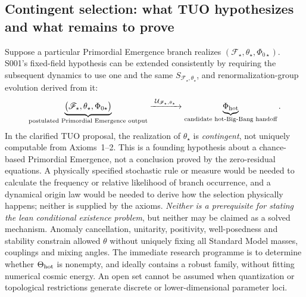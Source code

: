 \documentclass[11pt,a4paper]{article}
\theoremstyle{tmon}
\theoremstyle{definition}
\begin{document}
\subsection{Contingent selection: what TUO hypothesizes and what remains to prove}
Suppose a particular Primordial Emergence branch realizes $(\mathscr F_\star,\theta_\star,\Phi_{0\star})$. S001's fixed-field hypothesis can be extended consistently by requiring the subsequent dynamics to use one and the same $S_{\mathscr F_\star,\theta_\star}$, and renormalization-group evolution derived from it:
\begin{equation}\label{eq:c001selection}
\underbrace{\big(\mathscr F_\star,\theta_\star,\Phi_{0\star}\big)}_{\text{postulated Primordial Emergence output}}
\xrightarrow{\ \mathcal U_{\mathscr F_\star,\theta_\star}\ }
\underbrace{\Phi_{\rm hot}}_{\text{candidate hot-Big-Bang handoff}}.
\end{equation}
In the clarified TUO proposal, the realization of $\theta_\star$ is \emph{contingent}, not uniquely computable from Axioms~1--2. This is a founding hypothesis about a chance-based Primordial Emergence, not a conclusion proved by the zero-residual equations. A physically specified stochastic rule or measure would be needed to calculate the frequency or relative likelihood of branch occurrence, and a dynamical origin law would be needed to derive how the selection physically happens; neither is supplied by the axioms. \emph{Neither is a prerequisite for stating the lean conditional existence problem}, but neither may be claimed as a solved mechanism. Anomaly cancellation, unitarity, positivity, well-posedness and stability constrain allowed $\theta$ without uniquely fixing all Standard Model masses, couplings and mixing angles. The immediate research programme is to determine whether $\Theta_{\rm hot}$ is nonempty, and ideally contains a robust family, without fitting numerical cosmic energy. An open set cannot be assumed when quantization or topological restrictions generate discrete or lower-dimensional parameter loci.
\end{document}
